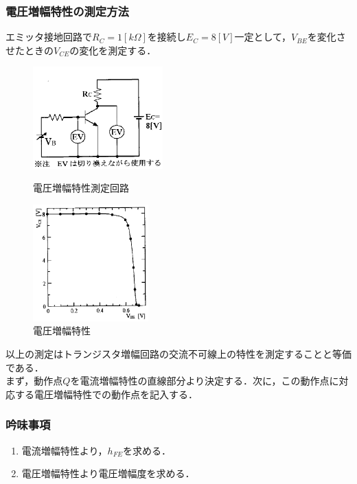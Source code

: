 \documentclass[10pt, a4j, dvipdfmx]{jarticle}
\begin{document}
    \subsubsection{電圧増幅特性の測定方法}
    エミッタ接地回路で$R_C = 1[k\Omega]$を接続し$E_C = 8[V]$一定として，$V_{BE}$を変化させたときの$V_{CE}$の変化を測定する．
    \begin{figure}[H]
        \begin{minipage}{0.5\hsize}
            \centering
            \includegraphics[width=50mm]{fig-7.png}
            \caption{電圧増幅特性測定回路}
            \label{fig:7}
        \end{minipage}
        \begin{minipage}{0.5\hsize}
            \centering
            \includegraphics[height=45mm]{fig-8.png}
            \caption{電圧増幅特性}
            \label{fig:8}
        \end{minipage}
    \end{figure}

    以上の測定はトランジスタ増幅回路の交流不可線上の特性を測定することと等価である．\\
    まず，動作点$Q$を電流増幅特性の直線部分より決定する．次に，この動作点に対応する電圧増幅特性での動作点を記入する．

    \subsubsection{吟味事項}
    \begin{enumerate}
        \item 電流増幅特性より，$h_{FE}$を求める．
        \item 電圧増幅特性より電圧増幅度を求める．
    \end{enumerate}
\end{document}

